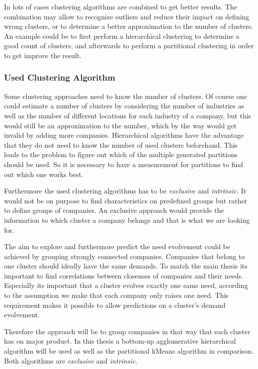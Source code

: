 In lots of cases clustering algorithms are combined to get better results. The combination may allow to recognize outliers
and reduce their impact on defining wrong clusters, or to determine a better approximation to the number of clusters.
An example could be to first perform a hierarchical clustering to determine a good count of clusters, and afterwards to perform
a partitional clustering in order to get improve the result.

\subsubsection{Used Clustering Algorithm}
\label{clusteringDiscussion}

Some clustering approaches need to know the number of clusters. Of course one could estimate a number of clusters
by considering the number of industries as well as the number of different locations for each industry of a company, but this would
still be an approximation to the number, which by the way would get invalid by adding more companies.
Hierarchical algorithms have the advantage that they do not need to know the number of used clusters beforehand.
This leads to the problem to figure out which of the multiple generated
partitions should be used. So it is necessary to have a measurement for partitions to find out which one
works best.

Furthermore the used clustering algorithms has to be \emph{exclusive} and \emph{intrinsic}. It would not be on purpose to find
characteristics on predefined groups but rather to define groups of companies. An exclusive approach would provide
the information to which cluster a company belongs and that is what we are looking for.


The aim to explore and furthermore predict the need evolvement could be achieved by grouping strongly connected companies.
Companies that belong to one cluster should ideally have the same demands. To match the main thesis its important to find
correlations between closeness of companies and their needs. Especially its important that a cluster evolves exactly one same
need, according to the assumption we make that each company only raises one need. This requirement makes it possible to allow predictions on a cluster's demand evolvement.

Therefore the approach will be to group companies in that way that each cluster has on major product.
In this thesis a bottom-up agglomerative hierarchical algorithm will be used as
well as the partitional kMeans algorithm in comparison. Both algorithms are \emph{exclusive} and \emph{intrinsic}.

